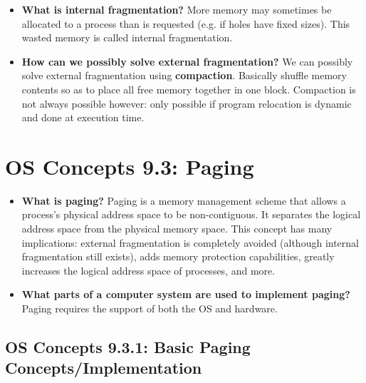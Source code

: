 \documentclass[12pt]{article}
\begin{document}
\begin{itemize}
    \item \textbf{What is internal fragmentation?} More memory may sometimes be allocated to a process than is requested (e.g. if holes have fixed sizes). This wasted memory is called internal fragmentation.
    \item \textbf{How can we possibly solve external fragmentation?} We can possibly solve external fragmentation using \textbf{compaction}. Basically shuffle memory contents so as to place all free memory together in one block. Compaction is not always possible however: only possible if program relocation is dynamic and done at execution time.
\end{itemize}

\section*{OS Concepts 9.3: Paging}

\begin{itemize}
    \item \textbf{What is paging?} Paging is a memory management scheme that allows a process's physical address space to be non-contiguous. It separates the logical address space from the physical memory space. This concept has many implications: external fragmentation is completely avoided (although internal fragmentation still exists), adds memory protection capabilities, greatly increases the logical address space of processes, and more. 
    \item \textbf{What parts of a computer system are used to implement paging?} Paging requires the support of both the OS and hardware.
\end{itemize}

\subsection*{OS Concepts 9.3.1: Basic Paging Concepts/Implementation}
\end{document}
